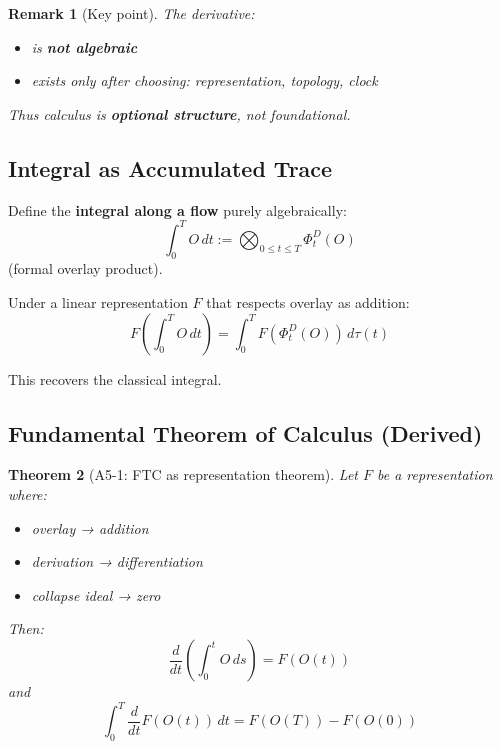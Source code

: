 \documentclass[12pt, oneside]{article}
\newtheorem{theorem}{Theorem}[section]
\newtheorem{remark}[theorem]{Remark}
\begin{document}
\begin{remark}[Key point]
The derivative:
\begin{itemize}
    \item is \textbf{not algebraic}
    \item exists only after choosing: representation, topology, clock
\end{itemize}
Thus calculus is \textbf{optional structure}, not foundational.
\end{remark}

\subsection{Integral as Accumulated Trace}

Define the \textbf{integral along a flow} purely algebraically:
\begin{equation}
\int_0^T O \, dt := \bigotimes_{0 \leq t \leq T} \Phi_t^D(O)
\end{equation}
(formal overlay product).

Under a linear representation $F$ that respects overlay as addition:
\begin{equation}
F\left( \int_0^T O \, dt \right) = \int_0^T F(\Phi_t^D(O)) \, d\tau(t)
\end{equation}

This recovers the classical integral.

\subsection{Fundamental Theorem of Calculus (Derived)}

\begin{theorem}[A5-1: FTC as representation theorem]
Let $F$ be a representation where:
\begin{itemize}
    \item overlay → addition
    \item derivation → differentiation
    \item collapse ideal → zero
\end{itemize}
Then:
\begin{equation}
\frac{d}{dt} \left( \int_0^t O \, ds \right) = F(O(t))
\end{equation}
and
\begin{equation}
\int_0^T \frac{d}{dt} F(O(t)) \, dt = F(O(T)) - F(O(0))
\end{equation}
\end{theorem}
\end{document}
